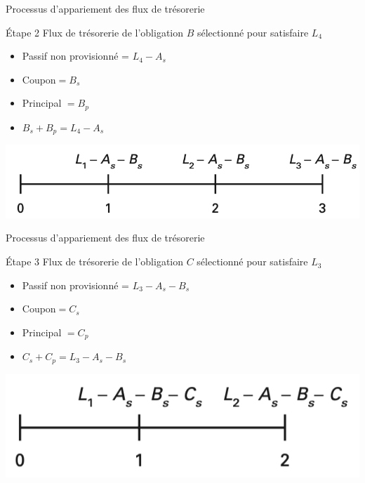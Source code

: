 \documentclass[10pt,a4paper]{beamer}
\begin{document}
\begin{frame}{Processus d'appariement des flux de trésorerie}
\begin{block}{Étape 2}
Flux de trésorerie de l'obligation $B$ sélectionné pour satisfaire $L_4$
\begin{itemize}[label=\bullet]
\item Passif non provisionné = $L_4 - A_s$
\item Coupon$=B_s$ 
\item Principal $=B_p$
\item $B_s+B_p=L_4 - A_s$
\end{itemize}
\end{block}
\includegraphics[scale=.5]{3}
\end{frame}


\begin{frame}{Processus d'appariement des flux de trésorerie}
\begin{block}{Étape 3}
Flux de trésorerie de l'obligation $C$ sélectionné pour satisfaire $L_3$
\begin{itemize}[label=\bullet]
\item Passif non provisionné = $L_3 - A_s-B_s$
\item Coupon$=C_s$ 
\item Principal $=C_p$
\item $C_s+C_p=L_3 - A_s-B_s$
\end{itemize}
\end{block}
\includegraphics[scale=.5]{4}
\end{frame}
\end{document}
